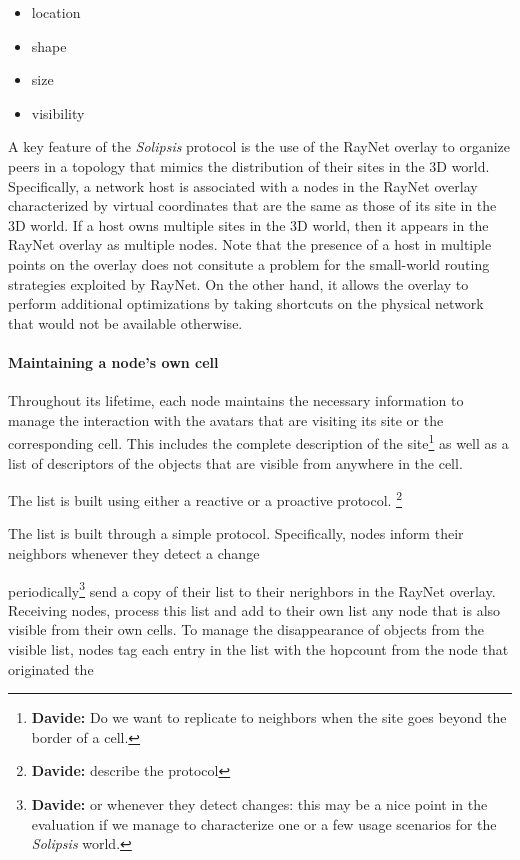 \documentclass{article}
\newcommand{\df}[1]{\footnote{\textbf{Davide: }#1}}
\newcommand{\sol}{\emph{Solipsis}\xspace}
\begin{document}
\begin{itemize}
\item  
location
\item
shape
\item
size
\item
visibility
\end{itemize}



A key feature of the \sol protocol is the use of the RayNet overlay to
organize peers in a topology that mimics the distribution of their
sites in the 3D world. Specifically, a network host is associated
with a nodes in the RayNet overlay characterized by virtual coordinates
that are the same as those of its site in the 3D world. If a host owns
multiple sites in the 3D world, then it appears in the RayNet overlay as
multiple nodes. Note that the presence of a host in multiple points on
the overlay does not consitute a problem for the small-world routing
strategies exploited by RayNet. On the other hand, it allows the overlay
to perform additional optimizations by taking shortcuts on the
physical network that would not be available otherwise. 

\paragraph{Maintaining a node's own cell}
Throughout its lifetime, each node maintains the necessary information
to manage the interaction with the avatars that are visiting its site
or the corresponding cell.  This includes the complete description of
the site\df{Do we want to replicate to neighbors when the site goes
  beyond the border of a cell.}  as well as a list of descriptors of
the objects that are visible from anywhere in the cell.

The list is built using either a reactive or a proactive protocol.
\df{describe the protocol}

The list is built through a simple protocol. Specifically, nodes
inform their neighbors whenever they detect a change 



periodically\df{or whenever they detect changes: this may be a nice
  point in the evaluation if we manage to characterize one or a few
  usage scenarios for the \sol world.} send a copy of their list to
their nerighbors in the RayNet overlay. Receiving nodes, process this
list and add to their own list any node that is also visible from
their own cells.  To manage the disappearance of objects from the
visible list, nodes tag each entry in the list with the hopcount from
the node that originated the 
\end{document}
